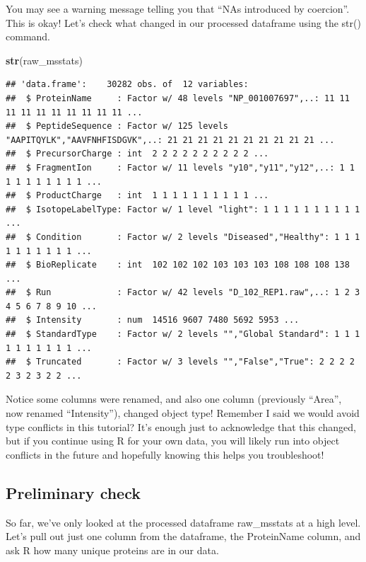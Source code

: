 \documentclass[]{book}
\newenvironment{Shaded}{\begin{snugshade}}{\end{snugshade}}
\newcommand{\KeywordTok}[1]{\textcolor[rgb]{0.13,0.29,0.53}{\textbf{#1}}}
\newcommand{\NormalTok}[1]{#1}
\begin{document}
You may see a warning message telling you that ``NAs introduced by coercion''. This is okay! Let's check what changed in our processed dataframe using the str() command.

\begin{Shaded}
\begin{Highlighting}[]
\KeywordTok{str}\NormalTok{(raw_msstats)}
\end{Highlighting}
\end{Shaded}

\begin{verbatim}
## 'data.frame':    30282 obs. of  12 variables:
##  $ ProteinName     : Factor w/ 48 levels "NP_001007697",..: 11 11 11 11 11 11 11 11 11 11 ...
##  $ PeptideSequence : Factor w/ 125 levels "AAPITQYLK","AAVFNHFISDGVK",..: 21 21 21 21 21 21 21 21 21 21 ...
##  $ PrecursorCharge : int  2 2 2 2 2 2 2 2 2 2 ...
##  $ FragmentIon     : Factor w/ 11 levels "y10","y11","y12",..: 1 1 1 1 1 1 1 1 1 1 ...
##  $ ProductCharge   : int  1 1 1 1 1 1 1 1 1 1 ...
##  $ IsotopeLabelType: Factor w/ 1 level "light": 1 1 1 1 1 1 1 1 1 1 ...
##  $ Condition       : Factor w/ 2 levels "Diseased","Healthy": 1 1 1 1 1 1 1 1 1 1 ...
##  $ BioReplicate    : int  102 102 102 103 103 103 108 108 108 138 ...
##  $ Run             : Factor w/ 42 levels "D_102_REP1.raw",..: 1 2 3 4 5 6 7 8 9 10 ...
##  $ Intensity       : num  14516 9607 7480 5692 5953 ...
##  $ StandardType    : Factor w/ 2 levels "","Global Standard": 1 1 1 1 1 1 1 1 1 1 ...
##  $ Truncated       : Factor w/ 3 levels "","False","True": 2 2 2 2 2 3 2 3 2 2 ...
\end{verbatim}

Notice some columns were renamed, and also one column (previously ``Area'', now renamed ``Intensity''), changed object type! Remember I said we would avoid type conflicts in this tutorial? It's enough just to acknowledge that this changed, but if you continue using R for your own data, you will likely run into object conflicts in the future and hopefully knowing this helps you troubleshoot!

\hypertarget{preliminary-check}{%
\subsection{Preliminary check}\label{preliminary-check}}

So far, we've only looked at the processed dataframe raw\_msstats at a high level. Let's pull out just one column from the dataframe, the ProteinName column, and ask R how many unique proteins are in our data.
\end{document}
